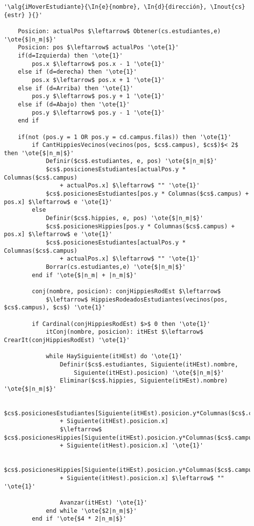 \begin{lstlisting}[mathescape]
'\alg{iMoverEstudiante}{\In{e}{nombre}, \In{d}{dirección}, \Inout{cs}{estr} }{}'

	Posicion: actualPos $\leftarrow$ Obtener(cs.estudiantes,e) '\ote{$|n_m|$}'
	Posicion: pos $\leftarrow$ actualPos '\ote{1}'
	if(d=Izquierda) then '\ote{1}'
		pos.x $\leftarrow$ pos.x - 1 '\ote{1}'
	else if (d=derecha) then '\ote{1}'
		pos.x $\leftarrow$ pos.x + 1 '\ote{1}'
	else if (d=Arriba) then '\ote{1}'
		pos.y $\leftarrow$ pos.y + 1 '\ote{1}'
 	else if (d=Abajo) then '\ote{1}'
 		pos.y $\leftarrow$ pos.y - 1 '\ote{1}'
 	end if

 	if(not (pos.y = 1 OR pos.y = cd.campus.filas)) then '\ote{1}'
		if CantHippiesVecinos(vecinos(pos, $cs$.campus), $cs$)$< 2$  then '\ote{$|n_m|$}'
			Definir($cs$.estudiantes, e, pos) '\ote{$|n_m|$}'
			$cs$.posicionesEstudiantes[actualPos.y * Columnas($cs$.campus) 
				+ actualPos.x] $\leftarrow$ "" '\ote{1}'
			$cs$.posicionesEstudiantes[pos.y * Columnas($cs$.campus) + pos.x] $\leftarrow$ e '\ote{1}'
		else
			Definir($cs$.hippies, e, pos) '\ote{$|n_m|$}'
			$cs$.posicionesHippies[pos.y * Columnas($cs$.campus) + pos.x] $\leftarrow$ e '\ote{1}'
			$cs$.posicionesEstudiantes[actualPos.y * Columnas($cs$.campus)
				+ actualPos.x] $\leftarrow$ "" '\ote{1}'
			Borrar(cs.estudiantes,e) '\ote{$|n_m|$}'
		end if '\ote{$|n_m| + |n_m|$}'

		conj(nombre, posicion): conjHippiesRodEst $\leftarrow$
			$\leftarrow$ HippiesRodeadosEstudiantes(vecinos(pos, $cs$.campus), $cs$) '\ote{1}'

		if Cardinal(conjHippiesRodEst) $>$ 0 then '\ote{1}'
			itConj(nombre, posicion): itHEst $\leftarrow$ CrearIt(conjHippiesRodEst) '\ote{1}'

			while HaySiguiente(itHEst) do '\ote{1}'
				Definir($cs$.estudiantes, Siguiente(itHEst).nombre,
					Siguiente(itHEst).posicion) '\ote{$|n_m|$}'
				Eliminar($cs$.hippies, Siguiente(itHEst).nombre) '\ote{$|n_m|$}'

				$cs$.posicionesEstudiantes[Siguiente(itHEst).posicion.y*Columnas($cs$.campus)
				+ Siguiente(itHEst).posicion.x]
				$\leftarrow$ $cs$.posicionesHippies[Siguiente(itHEst).posicion.y*Columnas($cs$.campus)
				+ Siguiente(itHest).posicion.x] '\ote{1}'

				$cs$.posicionesHippies[Siguiente(itHEst).posicion.y*Columnas($cs$.campus)
				+ Siguiente(itHest).posicion.x] $\leftarrow$ "" '\ote{1}'

				Avanzar(itHEst) '\ote{1}'
			end while '\ote{$2|n_m|$}'
		end if '\ote{$4 * 2|n_m|$}'


\end{lstlisting}
